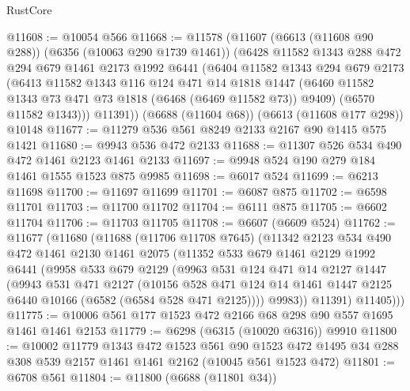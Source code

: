 \begin{lexlean}{RustCore}
\begin{coremodule}
@11608 := @10054 @566
@11668 := @11578
    (@11607
      (@6613 (@11608 @90 @288))
      (@6356 (@10063 @290 @1739 @1461))
      (@6428
        @11582
        @1343
        @288
        @472
        @294
        @679
        @1461
        @2173
        @1992
        @6441
        (@6404
          @11582
          @1343
          @294
          @679
          @2173
          (@6413
            @11582
            @1343
            @116
            @124
            @471
            @14
            @1818
            @1447
            (@6460 @11582 @1343 @73 @471 @73 @1818 (@6468 (@6469 @11582 @73)) @9409)
            (@6570 @11582 @1343)))
        @11391))
    (@6688 (@11604 @68))
    (@6613 (@11608 @177 @298))
    @10148
@11677 := @11279 @536 @561 @8249 @2133 @2167 @90 @1415 @575 @1421
@11680 := @9943 @536 @472 @2133
@11688 := @11307 @526 @534 @490 @472 @1461 @2123 @1461 @2133
@11697 := @9948 @524 @190 @279 @184 @1461 @1555 @1523 @875 @9985
@11698 := @6017 @524
@11699 := @6213 @11698
@11700 := @11697 @11699
@11701 := @6087 @875
@11702 := @6598 @11701
@11703 := @11700 @11702
@11704 := @6111 @875
@11705 := @6602 @11704
@11706 := @11703 @11705
@11708 := @6607 (@6609 @524)
@11762 := @11677
    (@11680
      (@11688
        (@11706 @11708 @7645)
        (@11342
          @2123
          @534
          @490
          @472
          @1461
          @2130
          @1461
          @2075
          (@11352
            @533
            @679
            @1461
            @2129
            @1992
            @6441
            (@9958
              @533
              @679
              @2129
              (@9963
                @531
                @124
                @471
                @14
                @2127
                @1447
                (@9943
                  @531
                  @471
                  @2127
                  (@10156
                    @528
                    @471
                    @124
                    @14
                    @1461
                    @1447
                    @2125
                    @6440
                    @10166
                    (@6582 (@6584 @528 @471 @2125))))
                @9983))
            @11391)
          @11405)))
@11775 := @10006 @561 @177 @1523 @472 @2166 @68 @298 @90 @557 @1695 @1461 @1461 @2153
@11779 := @6298 (@6315 (@10020 @6316)) @9910
@11800 := @10002
    @11779
    @1343
    @472
    @1523
    @561
    @90
    @1523
    @472
    @1495
    @34
    @288
    @308
    @539
    @2157
    @1461
    @1461
    @2162
    (@10045 @561 @1523 @472)
@11801 := @6708 @561
@11804 := @11800 (@6688 (@11801 @34))

\end{coremodule}
\end{lexlean}
